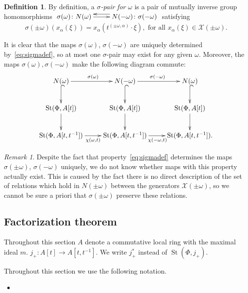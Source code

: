 \documentclass[oneside, 10pt]{amsart}
\DeclareMathOperator{\St}{St}
\newcommand{\XX}{\mathcal{X}}           %
\numberwithin{equation}{section}
\numberwithin{lemma}{section}
\theoremstyle{definition}
\newtheorem{dfn}[lemma]{Definition}
\theoremstyle{remark}
\newtheorem{rem}[lemma]{Remark}
\begin{document}
\begin{dfn} \label{dfn:sigma-pair}
By definition, a {\it $\sigma$-pair for $\omega$} is a pair of mutually inverse group homomorphisms 
$\xymatrix{ \sigma(\omega)\colon N(\omega) \ar[r] & \ar@<-1.0ex>[l] N(-\omega)\colon \sigma(-\omega) }$ satisfying
\begin{equation} \label{eq:sigmadef}
\sigma(\pm \omega)(x_\alpha(\xi)) = x_\alpha(t^{(\pm \omega, \alpha)}\cdot \xi), 
 \text{ for all } x_\alpha(\xi) \in \XX(\pm\omega).
\end{equation}\end{dfn}
It is clear that the maps $\sigma(\omega)$, $\sigma(-\omega)$ are uniquely determined by~\eqref{eq:sigmadef}, so at most one $\sigma$-pair may exist for any given $\omega$.
Moreover, the maps $\sigma(\omega), \sigma(-\omega)$ make the following diagram commute:
\begin{equation} \label{eq:sigma-diagram}
\xymatrix{ N(\omega) \ar[r]^{\sigma(\omega)}\ar@{^{(}->}[d] & N(-\omega) \ar@{^{(}->}[d] \ar[r]^{\sigma(-\omega)} & N(\omega) \ar@{^{(}->}[d] \\ 
          \St(\Phi, A[t]) \ar[d] & \St(\Phi, A[t]) \ar[d] & \St(\Phi, A[t]) \ar[d] \\
          \St(\Phi, A[t, t^{-1}]) \ar@<-0.0ex>[r]_{\chi(\omega, t)} & \St(\Phi, A[t, t^{-1}]) \ar@<-0.0ex>[r]_{\chi(-\omega, t)} & \St(\Phi, A[t, t^{-1}]).} \end{equation}  

\begin{rem} Despite the fact that property~\eqref{eq:sigmadef} determines the maps $\sigma(\pm \omega)$, $\sigma(-\omega)$ uniquely, 
 we do not know whether maps with this property actually exist.
This is caused by the fact there is no direct description of the set of relations which hold in $N(\pm\omega)$ between the generators $\XX(\pm\omega)$, 
 so we cannot be sure a priori that $\sigma(\pm\omega)$ preserve these relations. \end{rem}

\subsection{Factorization theorem} 
Throughout this section $A$ denote a commutative local ring with the maximal ideal $m$.
$j_+\colon A[t] \to A[t, t^{-1}]$. We write $j_+^*$ instead of $\St(\Phi, j_+)$.
 
Throughout this section we use the following notation.
\begin{itemize}
 \item 
\end{itemize}
\end{document}
